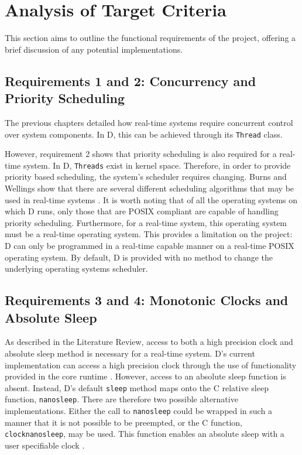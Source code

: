 \section{Analysis of Target Criteria} 
This section aims to outline the functional requirements of the project,
offering a brief discussion of any potential implementations.

\subsection{Requirements 1 and 2: Concurrency and Priority Scheduling} %
The previous chapters detailed how real-time systems require concurrent control
over system components. In D, this can be achieved through its \texttt{Thread} class. 
\par\bigskip\noindent
However, requirement 2 shows that priority scheduling is also required for a
real-time system. 
In D, \texttt{Threads} exist in kernel space. Therefore, in order to
provide priority based scheduling, the system's scheduler requires changing. Burns
and Wellings show that there are several different scheduling algorithms that
may be used in real-time systems \cite{real-time-systems}. It is worth noting
that of all the operating systems on which D runs, only those that are POSIX
compliant are capable of handling priority scheduling. Furthermore, for a
real-time system, this operating system must be a real-time operating system.
This provides a limitation on the project: D can only be programmed in a real-time
capable manner on a real-time POSIX operating system. 
By default, D is provided with no method to change the underlying operating
systems scheduler. 

\subsection{Requirements 3 and 4: Monotonic Clocks and Absolute Sleep} 
As described in the Literature Review, access to both a high precision
clock and absolute sleep method is necessary for a real-time system. D's
current implementation can access a high precision clock through the use of
functionality provided in the core runtime \cite{dlang-core-time}. However,
access to an absolute sleep function is absent. Instead, D's default
\texttt{sleep}
method maps onto the C relative sleep function, \texttt{nanosleep}. There are
therefore two possible alternative implementations. Either the call to
\texttt{nanosleep} could be wrapped in such a manner that it is not possible to be preempted, 
or the C function, \texttt{clock\textunderscore{}nanosleep}, may be used. This function enables 
an absolute sleep with a user specifiable clock \cite{clock-nanosleep}. 


